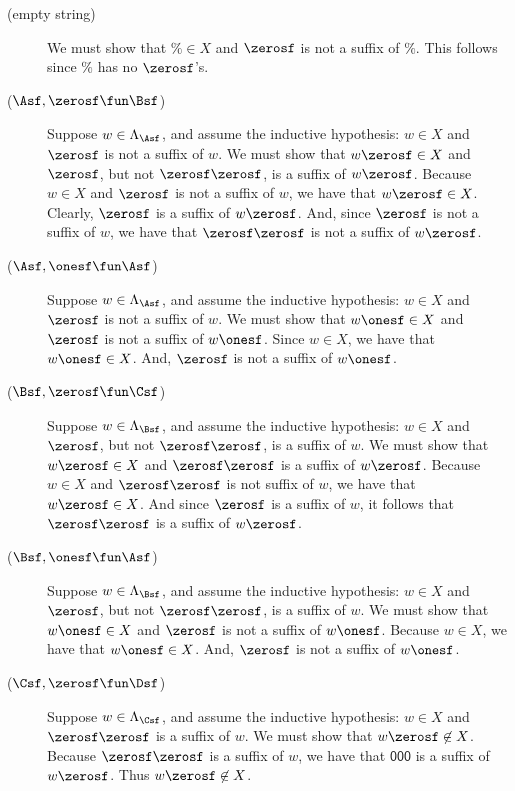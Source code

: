 \begin{description}
\item[\quad(empty string)] We must show that  $\%\in X$ and
  $\zerosf$ is not a suffix of $\%$.  This follows since $\%$ has
  no $\zerosf$'s.

\item[\quad($\Asf, \zerosf\fun\Bsf$)] Suppose $w\in\Lambda_\Asf$, and
  assume the inductive hypothesis: $w\in X$ and $\zerosf$ is not a
  suffix of $w$.  We must show that $w\zerosf\in X$ and
  $\zerosf$, but not $\zerosf\zerosf$, is a suffix of
  $w\zerosf$. Because $w\in X$ and $\zerosf$ is not a suffix of $w$,
  we have that $w\zerosf\in X$.  Clearly, $\zerosf$ is a suffix of
  $w\zerosf$.  And, since $\zerosf$ is not a suffix of $w$, we have
  that $\zerosf\zerosf$ is not a suffix of $w\zerosf$.

\item[\quad($\Asf, \onesf\fun\Asf$)] Suppose $w\in\Lambda_\Asf$, and
  assume the inductive hypothesis: $w\in X$ and $\zerosf$ is not a
  suffix of $w$.  We must show that $w\onesf\in X$ and $\zerosf$ is
  not a suffix of $w\onesf$.  Since $w\in X$, we have that $w\onesf\in
  X$.  And, $\zerosf$ is not a suffix of $w\onesf$.

\item[\quad($\Bsf, \zerosf\fun\Csf$)] Suppose $w\in\Lambda_\Bsf$, and
  assume the inductive hypothesis: $w\in X$ and $\zerosf$, but not
  $\zerosf\zerosf$, is a suffix of $w$.  We must show that
  $w\zerosf\in X$ and $\zerosf\zerosf$ is a suffix of $w\zerosf$.
  Because $w\in X$ and $\zerosf\zerosf$ is not suffix of $w$, we have
  that $w\zerosf\in X$.  And since $\zerosf$ is a suffix of $w$, it
  follows that $\zerosf\zerosf$ is a suffix of $w\zerosf$.

\item[\quad($\Bsf, \onesf\fun\Asf$)] Suppose $w\in\Lambda_\Bsf$, and
  assume the inductive hypothesis: $w\in X$ and $\zerosf$, but not
  $\zerosf\zerosf$, is a suffix of $w$.  We must show that $w\onesf\in
  X$ and $\zerosf$ is not a suffix of $w\onesf$.  Because $w\in X$, we
  have that $w\onesf\in X$.  And, $\zerosf$ is not a suffix of
  $w\onesf$.

\item[\quad($\Csf, \zerosf\fun\Dsf$)] Suppose $w\in\Lambda_\Csf$, and
  assume the inductive hypothesis: $w\in X$ and $\zerosf\zerosf$ is a
  suffix of $w$.  We must show that $w\zerosf\not\in X$.  Because
  $\zerosf\zerosf$ is a suffix of $w$, we have that $\mathsf{000}$ is
  a suffix of $w\zerosf$.  Thus $w\zerosf\not\in X$.


\end{description}
